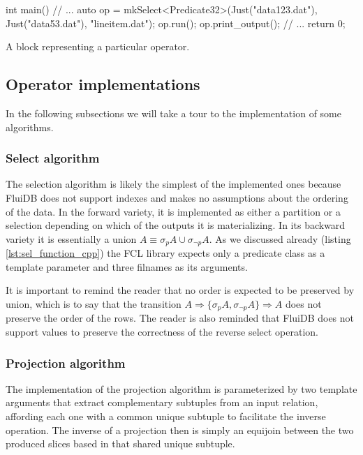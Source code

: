 \begin{code}
\begin{cppcode}
int main() {
  // ...
  {
    auto op = mkSelect<Predicate32>(Just("data123.dat"), Just("data53.dat"),
                                    "lineitem.dat");
    op.run();
    op.print_output();
  }
  // ...
  return 0;
}
\end{cppcode}
  \caption{\label{lst:gen_out_code}A block representing a particular
    operator.}
\end{code}


\subsection{Operator implementations}

In the following subsections we will take a tour to the implementation
of some algorithms.

\subsubsection{Select algorithm}

The selection algorithm is likely the simplest of the implemented ones
because FluiDB does not support indexes and makes no assumptions about
the ordering of the data. In the forward variety, it is implemented as
either a partition or a selection depending on which of the outputs it
is materializing. In its backward variety it is essentially a union
\(A \equiv \sigma_p A \cup \sigma_{\neg p} A\). As we discussed
already (listing \ref{lst:sel_function_cpp}) the FCL library expects
only a predicate class as a template parameter and three filnames as
its arguments.

It is important to remind the reader that no order is expected to be
preserved by union, which is to say that the transition \(A
\Rightarrow \{\sigma_p A, \sigma_{\neg p} A\} \Rightarrow A\) does not
preserve the order of the rows. The reader is also reminded that
FluiDB does not support  values to preserve the correctness of
the reverse select operation.


\subsubsection{Projection algorithm}
\label{sec:projection_algorithm}

The implementation of the projection algorithm is parameterized by two
template arguments that extract complementary subtuples from an input
relation, affording each one with a common unique subtuple to
facilitate the inverse operation. The inverse of a projection then is
simply an equijoin between the two produced slices based in that
shared unique subtuple.


